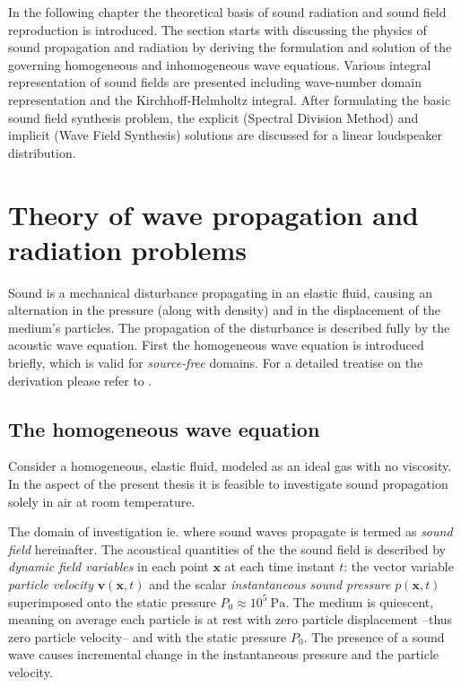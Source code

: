 In the following chapter the theoretical basis of sound radiation and sound field reproduction is introduced. The section starts with discussing the physics of sound propagation and radiation by deriving the formulation and solution of the governing homogeneous and inhomogeneous wave equations. Various integral representation of sound fields are presented including wave-number domain representation and the Kirchhoff-Helmholtz integral. After formulating the basic sound field synthesis problem, the explicit (Spectral Division Method) and implicit (Wave Field Synthesis) solutions are discussed for a linear loudspeaker distribution.
%

\section{Theory of wave propagation and radiation problems}

Sound is a mechanical disturbance propagating in an elastic fluid, causing an alternation in the pressure (along with density) and in the displacement of the medium's particles. The propagation of the disturbance is described fully by the acoustic wave equation. First the homogeneous wave equation is introduced briefly, which is valid for \emph{source-free} domains. For a detailed treatise on the derivation please refer to \cite{Beranek1993, Morse1968, Williams1999, Blackstock2000}.

\subsection{The homogeneous wave equation}

Consider a homogeneous, elastic fluid, modeled as an ideal gas with no viscosity. In the aspect of the present thesis it is feasible to investigate sound propagation solely in air at room temperature. 

%
The domain of investigation ie. where sound waves propagate is termed as \emph{sound field} hereinafter.
The acoustical quantities of the the sound field is described by \emph{dynamic field variables} in each point $\mathbf{x}$ at each time instant $t$: the vector variable \emph{particle velocity} $\mathbf{v}(\mathbf{x},t)$ and the scalar \emph{instantaneous sound pressure} $p(\mathbf{x},t)$ superimposed onto the static pressure $P_0 \approx 10^5~\mathrm{Pa}$.
The medium is quiescent, meaning on average each particle is at rest with zero particle displacement --thus zero particle velocity-- and with the static pressure $P_0$. 
The presence of a sound wave causes incremental change in the instantaneous pressure and the particle velocity.
%

